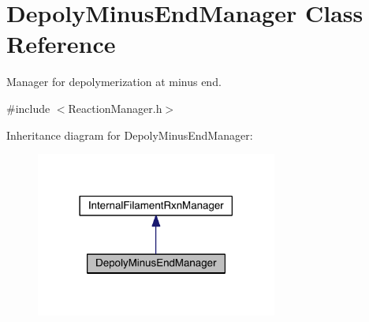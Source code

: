 \hypertarget{classDepolyMinusEndManager}{\section{Depoly\+Minus\+End\+Manager Class Reference}
\label{classDepolyMinusEndManager}
}


Manager for depolymerization at minus end.  




{\ttfamily \#include $<$Reaction\+Manager.\+h$>$}



Inheritance diagram for Depoly\+Minus\+End\+Manager\+:\nopagebreak
\begin{figure}[H]
\begin{center}
\leavevmode
\includegraphics[width=225pt]{classDepolyMinusEndManager__inherit__graph}
\end{center}
\end{figure}


